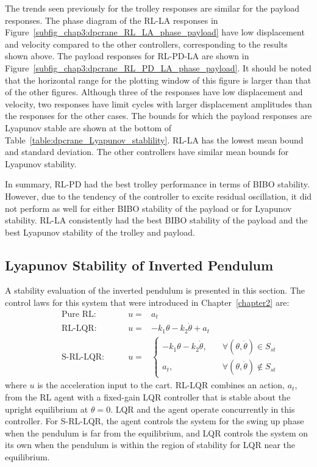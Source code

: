The trends seen previously for the trolley responses are similar for the payload responses. The phase diagram of the RL-LA responses in Figure~\ref{subfig_chap3:dpcrane_RL_LA_phase_payload} have low displacement and velocity compared to the other controllers, corresponding to the results shown above. The payload responses for RL-PD-LA are shown in Figure~\ref{subfig_chap3:dpcrane_RL_PD_LA_phase_payload}. It should be noted that the horizontal range for the plotting window of this figure is larger than that of the other figures. Although three of the responses have low displacement and velocity, two responses have limit cycles with larger displacement amplitudes than the responses for the other cases.
%
The bounds for which the payload responses are Lyapunov stable are shown at the bottom of Table~\ref{table:dpcrane_Lyapunov_stablility}. RL-LA has the lowest mean bound and standard deviation. The other controllers have similar mean bounds for Lyapunov stability.

In summary, RL-PD had the best trolley performance in terms of BIBO stability. However, due to the tendency of the controller to excite residual oscillation, it did not perform as well for either BIBO stability of the payload or for Lyapunov stability. RL-LA consistently had the best BIBO stability of the payload and the best Lyapunov stability of the trolley and payload.


\subsection{Lyapunov Stability of Inverted Pendulum}

A stability evaluation of the inverted pendulum is presented in this section. The control laws for this system that were introduced in Chapter~\ref{chapter2} are:
%
\begin{align*}
  & \qquad\qquad\text{Pure RL:} \qquad  &u=& a_t \qquad\\
  & \qquad\qquad\text{RL-LQR:} \qquad  &u=& -k_1\theta - k_2\dot{\theta} + a_t \qquad\\
  & \qquad\qquad\text{S-RL-LQR:} \qquad &u=& 
\left\{
  \begin{array}{cl}
      -k_1\theta - k_2\dot{\theta}, & \quad \forall (\theta, \dot{\theta}) \in S_{st}\\
      a_t, & \quad \forall(\theta,\dot{\theta})\notin S_{st}
  \end{array}
  \right. \qquad
\end{align*}
%
where $u$ is the acceleration input to the cart.
RL-LQR combines an action, $a_t$, from the RL agent with a fixed-gain LQR controller that is stable about the upright equilibrium at $\theta=0$. LQR and the agent operate concurrently in this controller. For S-RL-LQR, the agent controls the system for the swing up phase when the pendulum is far from the equilibrium, and LQR controls the system on its own when the pendulum is within the region of stability for LQR near the equilibrium.

